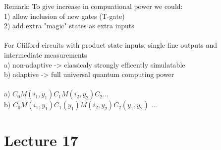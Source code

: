 \documentclass{article}
\begin{document}
                       Remark: To give increase in compuational power we could:\\
                       1) allow inclusion of new gates (T-gate)\\
                       2) add extra "magic" states as extra inputs\\\\
                       For Clifford circuits with product state inputs, single line outputs and intermediate measurements\\
                       a) non-adaptive -> classicaly strongly efficently simulatable\\
                       b) adaptive -> full universal quantum computing power\\\\
                       a) $C_0 M(i_1, y_1) C_1 M( i_2, y_2) C_2$...\\
                       b) $C_0 M(i_1, y_1) C_1(y_1) M(i_2, y_2) C_2(y_1, y_2)$ ...
                       \section{Lecture 17}
\end{document}

